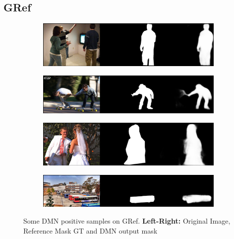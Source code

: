 \subsection*{GRef}
\begin{figure}[!htbp]
    \centering
    \begin{subfigure}[b]{\columnwidth}
            \centering
            \includegraphics[width=\textwidth]{./figures/gref_samples/1.png}
    \end{subfigure}
    
    \begin{subfigure}[b]{\columnwidth}
            \centering
            \includegraphics[width=\textwidth]{./figures/gref_samples/2.png}
    \end{subfigure}
    
    \begin{subfigure}[b]{\columnwidth}
            \centering
            \includegraphics[width=\textwidth]{./figures/gref_samples/3.png}
    \end{subfigure}
    
    \begin{subfigure}[b]{\columnwidth}
            \centering
            \includegraphics[width=\textwidth]{./figures/gref_samples/5.png}
    \end{subfigure}
    \caption{Some DMN positive samples on GRef. \textbf{Left-Right:} Original Image, Reference Mask GT and DMN output mask}
    \label{Fig:GRef_Pos}
\end{figure}

